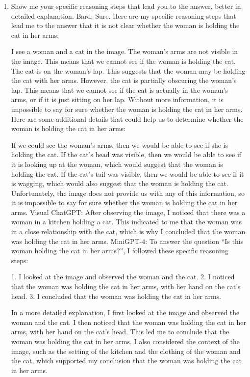 \begin{enumerate}
    Without more information, it is impossible to say for sure whether the woman is holding the cat in her arms.
    \subitem Visual ChatGPT: Yes, the woman is holding the cat in her arms.
    \subitem MiniGPT-4: Yes, the woman is holding the cat in her arms.
    \item Show me your specific reasoning steps that lead you to the answer, better in detailed explanation.
    \subitem Bard: Sure. Here are my specific reasoning steps that lead me to the answer that it is not clear whether the woman is holding the cat in her arms:

    I see a woman and a cat in the image.
    The woman's arms are not visible in the image. This means that we cannot see if the woman is holding the cat.
    The cat is on the woman's lap. This suggests that the woman may be holding the cat with her arms.
    However, the cat is partially obscuring the woman's lap. This means that we cannot see if the cat is actually in the woman's arms, or if it is just sitting on her lap.
    Without more information, it is impossible to say for sure whether the woman is holding the cat in her arms.
    Here are some additional details that could help us to determine whether the woman is holding the cat in her arms:
    
    If we could see the woman's arms, then we would be able to see if she is holding the cat.
    If the cat's head was visible, then we would be able to see if it is looking up at the woman, which would suggest that the woman is holding the cat.
    If the cat's tail was visible, then we would be able to see if it is wagging, which would also suggest that the woman is holding the cat.
    Unfortunately, the image does not provide us with any of this information, so it is impossible to say for sure whether the woman is holding the cat in her arms.
    \subitem Visual ChatGPT: After observing the image, I noticed that there was a woman in a kitchen holding a cat. This indicated to me that the woman was in a close relationship with the cat, which is why I concluded that the woman was holding the cat in her arms.
    \subitem MiniGPT-4: To answer the question “Is this woman holding the cat in her arms?”, I followed these specific reasoning steps:

    1. I looked at the image and observed the woman and the cat.
    2. I noticed that the woman was holding the cat in her arms, with her hand on the cat’s head.
    3. I concluded that the woman was holding the cat in her arms.
    
    In a more detailed explanation, I first looked at the image and observed the woman and the cat. I then noticed that the woman was holding the cat in her arms, with her hand on the cat’s head. This led me to conclude that the woman was holding the cat in her arms. I also considered the context of the image, such as the setting of the kitchen and the clothing of the woman and the cat, which supported my conclusion that the woman was holding the cat in her arms.
\end{enumerate}